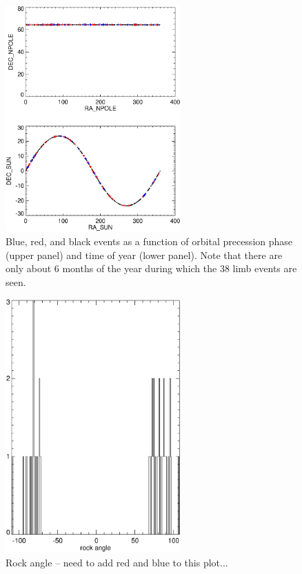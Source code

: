 \documentclass[aps,twocolumn,prd,superscriptaddress,showpacs,nofootinbib,fixfloat]{revtex4}
\begin{document}
\begin{figure}[p]
\centering
\includegraphics[width=0.6\textwidth]{plots/sun.ps}
\caption{Blue, red, and black events as a function of orbital precession phase
  (upper panel) and time of year (lower panel).  Note that there are only
  about 6 months of the year during which the 38 limb events are seen. 
}
\label{fig:sun}
\end{figure}

\begin{figure}[p]
\centering
\includegraphics[width=0.6\textwidth]{plots/rockangle.ps}
\caption{Rock angle -- need to add red and blue to this plot...
}
\label{fig:rock}
\end{figure}
\end{document}
